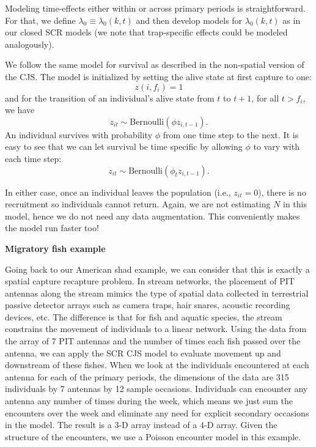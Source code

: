 Modeling time-effects either
within or across primary periods
is straightforward. For that, we define $\lambda_{0} \equiv
\lambda_{0}(k,t)$ and then develop models for
$\lambda_{0}(k,t)$ as in our closed SCR models (we note that
trap-specific effects could be modeled analogously).

We follow the same model for survival as described in the non-spatial version of the
CJS.  The model is initialized by setting the alive
state at first capture to one:
\[
 z(i,f_i) = 1
\]
and for the transition of an individual's alive state from $t$ to $t+1$, for
all $t > f_i$, we have
\[
z_{it} \sim \mbox{Bernoulli}( \phi z_{i,t-1}).
\]
An individual survives with probability
$\phi$ from one time step to the next.  It is easy to see that we can let
survival be time specific by allowing $\phi$ to vary with each time step:
\[
 z_{it} \sim \mbox{Bernoulli}( \phi_t z_{i,t-1}).
\]

In either case, once an individual leaves the
population (i.e., $z_{it} = 0$), there is no recruitment so individuals cannot
return.  Again, we are not estimating $N$ in this model, hence we do not need
any data augmentation.  This conveniently makes the model run
faster too!


{\bf Migratory fish example}

Going back to our American shad example, we can consider that this is
exactly a spatial capture recapture problem.
In stream networks, the placement of PIT antennas along the stream mimics the
type of spatial data collected in terrestrial passive detector arrays such as
camera traps, hair snares, acoustic recording devices, etc.  The
difference is that for fish and aquatic species, the stream constrains
the movement of individuals to a linear network.  Using the data from the
array of 7 PIT antennas and the number of
times each fish passed over the antenna, we can apply the SCR CJS model to
evaluate movement up and downstream of these fishes.
When we look at the individuals encountered at each antenna for each of the primary periods,
the dimensions of the data are 315
individuals by 7 antennas by 12 sample occasions. Individuals can
encounter any antenna any number of times during the week, which means
we just sum the encounters over the week and eliminate any need for
explicit secondary occasions in the model. The result is a 3-D array
instead of a 4-D array.  Given the structure of the encounters, we use
a Poisson encounter model in this example.

